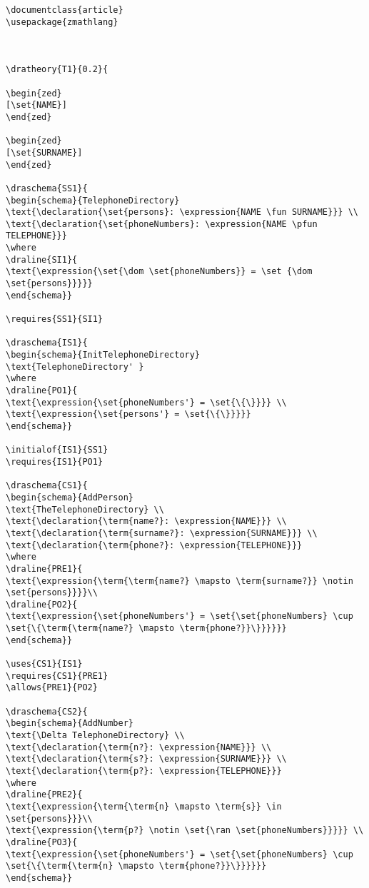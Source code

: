 \begin{verbatim}
\documentclass{article}
\usepackage{zmathlang}



\dratheory{T1}{0.2}{

\begin{zed}
[\set{NAME}] 
\end{zed}

\begin{zed}
[\set{SURNAME}]
\end{zed}

\draschema{SS1}{
\begin{schema}{TelephoneDirectory}
\text{\declaration{\set{persons}: \expression{NAME \fun SURNAME}}} \\ 
\text{\declaration{\set{phoneNumbers}: \expression{NAME \pfun TELEPHONE}}}
\where 
\draline{SI1}{
\text{\expression{\set{\dom \set{phoneNumbers}} = \set {\dom \set{persons}}}}}
\end{schema}}

\requires{SS1}{SI1}

\draschema{IS1}{
\begin{schema}{InitTelephoneDirectory} 
\text{TelephoneDirectory' }
\where 
\draline{PO1}{
\text{\expression{\set{phoneNumbers'} = \set{\{\}}}} \\
\text{\expression{\set{persons'} = \set{\{\}}}}}
\end{schema}}

\initialof{IS1}{SS1}
\requires{IS1}{PO1}

\draschema{CS1}{
\begin{schema}{AddPerson}
\text{TheTelephoneDirectory} \\
\text{\declaration{\term{name?}: \expression{NAME}}} \\
\text{\declaration{\term{surname?}: \expression{SURNAME}}} \\
\text{\declaration{\term{phone?}: \expression{TELEPHONE}}}
\where
\draline{PRE1}{
\text{\expression{\term{\term{name?} \mapsto \term{surname?}} \notin \set{persons}}}}\\
\draline{PO2}{
\text{\expression{\set{phoneNumbers'} = \set{\set{phoneNumbers} \cup \set{\{\term{\term{name?} \mapsto \term{phone?}}\}}}}}}
\end{schema}}

\uses{CS1}{IS1}
\requires{CS1}{PRE1}
\allows{PRE1}{PO2}

\draschema{CS2}{
\begin{schema}{AddNumber}
\text{\Delta TelephoneDirectory} \\
\text{\declaration{\term{n?}: \expression{NAME}}} \\
\text{\declaration{\term{s?}: \expression{SURNAME}}} \\
\text{\declaration{\term{p?}: \expression{TELEPHONE}}}
\where
\draline{PRE2}{
\text{\expression{\term{\term{n} \mapsto \term{s}} \in \set{persons}}}\\
\text{\expression{\term{p?} \notin \set{\ran \set{phoneNumbers}}}}} \\
\draline{PO3}{
\text{\expression{\set{phoneNumbers'} = \set{\set{phoneNumbers} \cup \set{\{\term{\term{n} \mapsto \term{phone?}}\}}}}}}
\end{schema}}


\end{verbatim}
